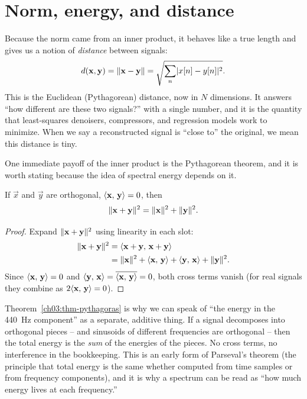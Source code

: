 \section{Norm, energy, and distance}
\label{ch03:norm}

Because the norm came from an inner product, it behaves like a true length and gives us a notion
of \emph{distance} between signals:
\[
  d(\mathbf{x},\mathbf{y}) = \lVert\mathbf{x}-\mathbf{y}\rVert = \sqrt{\sum_n \lvert x[n]-y[n]\rvert^2}.
\]
This is the Euclidean (Pythagorean) distance, now in $N$ dimensions. It answers ``how different
are these two signals?'' with a single number, and it is the quantity that least-squares denoisers,
compressors, and regression models work to minimize. When we say a reconstructed signal is
``close to'' the original, we mean this distance is tiny.

One immediate payoff of the inner product is the Pythagorean theorem, and it is worth stating
because the idea of spectral energy depends on it.

\begin{theorem}
\label{ch03:thm-pythagoras}
If $\vec{x}$ and $\vec{y}$ are orthogonal, $\langle \mathbf{x},\, \mathbf{y} \rangle=0$, then
\[
  \lVert\mathbf{x}+\mathbf{y}\rVert^2 = \lVert\mathbf{x}\rVert^2 + \lVert\mathbf{y}\rVert^2 .
\]
\end{theorem}

\begin{proof}
Expand $\lVert\mathbf{x}+\mathbf{y}\rVert^2$ using linearity in each slot:
\begin{align*}
  \lVert\mathbf{x}+\mathbf{y}\rVert^2 &= \langle \mathbf{x}+\mathbf{y},\, \mathbf{x}+\mathbf{y} \rangle \\
  &= \lVert\mathbf{x}\rVert^2 + \langle \mathbf{x},\, \mathbf{y} \rangle + \langle \mathbf{y},\, \mathbf{x} \rangle + \lVert\mathbf{y}\rVert^2 .
\end{align*}
Since $\langle \mathbf{x},\, \mathbf{y} \rangle = 0$ and $\langle \mathbf{y},\, \mathbf{x} \rangle = \overline{\langle \mathbf{x},\, \mathbf{y} \rangle} = 0$,
both cross terms vanish (for real signals they combine as $2\langle \mathbf{x},\, \mathbf{y} \rangle = 0$).
\end{proof}

\begin{aestheticbox}
Theorem~\ref{ch03:thm-pythagoras} is why we can speak of ``the energy in the 440~Hz component'' as a
separate, additive thing. If a signal decomposes into orthogonal pieces -- and sinusoids of
different frequencies are orthogonal -- then the total energy is the \emph{sum} of the
energies of the pieces. No cross terms, no interference in the bookkeeping. This is an early form of Parseval's
theorem (the principle that total energy is the same whether computed from time samples or from frequency components), and it is why a spectrum can be read as ``how much energy lives at
each frequency.''
\end{aestheticbox}

